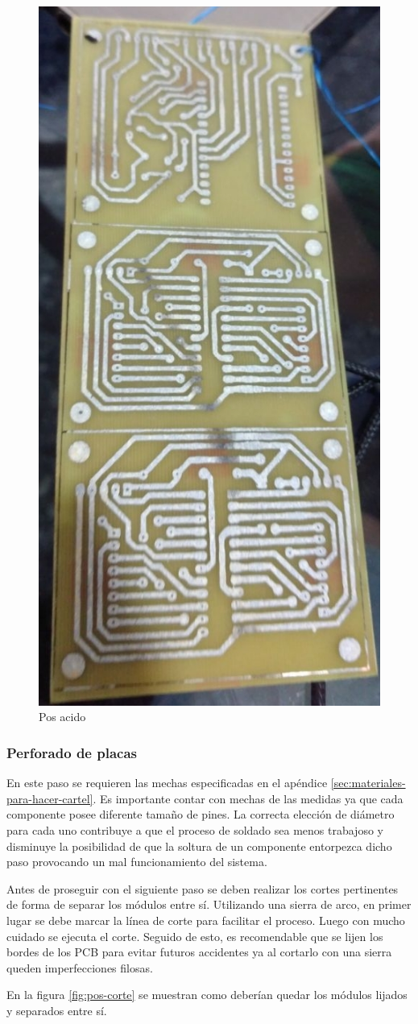 \begin{figure}[ht!]
	\centering
	\includegraphics[width=0.36\linewidth]{imagenes/pcbeando/pos-acido-2.jpeg}
	\caption{Pos acido}
	\label{fig:pos-acido}
\end{figure}

\subsubsection{Perforado de placas}
En este paso se requieren las mechas especificadas en el apéndice \ref{sec:materiales-para-hacer-cartel}. Es importante contar con mechas de las medidas ya que cada componente posee diferente tamaño de pines. La correcta elección de diámetro para cada uno contribuye a que el proceso de soldado sea menos trabajoso y disminuye la posibilidad de que la soltura de un componente entorpezca dicho paso provocando un mal funcionamiento del sistema.

Antes de proseguir con el siguiente paso se deben realizar los cortes pertinentes de forma de separar los módulos entre sí. Utilizando una sierra de arco, en primer lugar se debe marcar la línea de corte para facilitar el proceso.
Luego con mucho cuidado se ejecuta el corte. Seguido de esto, es recomendable que se lijen los bordes de los PCB para evitar futuros accidentes ya al cortarlo con una sierra queden imperfecciones filosas.

En la figura \ref{fig:pos-corte} se muestran como deberían quedar los módulos lijados y separados entre sí.

